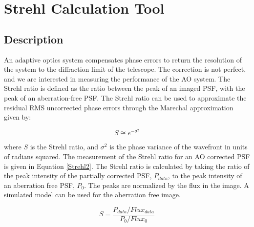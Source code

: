 \chapter{Strehl Calculation Tool}

\section{Description}

An adaptive optics system compensates phase errors to return the resolution of the system to the diffraction limit of the telescope. The correction is not perfect, and we are interested in measuring the performance of the AO system. The Strehl ratio is defined as the ratio between the peak of an imaged PSF, with the peak of an aberration-free PSF. The Strehl ratio can be used to approximate the residual RMS uncorrected phase errors through the Marechal approximation given by:

\begin{equation}
    S \cong e^{-\sigma^2}
\end{equation}

where $S$ is the Strehl ratio, and $\sigma^2$ is the phase variance of the wavefront in units of radians squared. The measurement of the Strehl ratio for an AO corrected PSF is given in Equation \ref{Strehl2}. The Strehl ratio is calculated by taking the ratio of the peak intensity of the partially corrected PSF, $P_{data}$,  to the peak intensity of an aberration free PSF, $P_0$. The peaks are normalized by the flux in the image. A simulated model can be used for the aberration free image. 

\begin{equation}
    S=\frac{P_{data}/Flux_{data}}{P_{0}/Flux_{0}}
    \label{Strehl2}
\end{equation}


